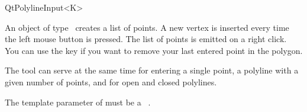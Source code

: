 
\begin{ccRefClass}{QtPolylineInput<K>}

\ccDefinition
An object of type \ccRefName\ creates a list of points. A new 
vertex is inserted every time the left mouse button is pressed.
The list of points is emitted on a right click. You can use the 
key if you want to remove your last entered point in the polygon.

The tool can serve at the same time for entering a single point,
a polyline with a given number of points, and for open and closed
polylines.


\ccParameters

The template parameter of  must be a \cgal\ . 

\ccInheritsFrom
{}

\ccGlue

\ccCreation
{}


\end{ccRefClass}







